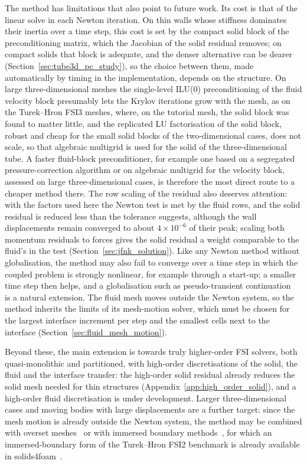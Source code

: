 The method has limitations that also point to future work.
Its cost is that of the linear solve in each Newton iteration.
On thin walls whose stiffness dominates their inertia over a time step, this cost is set by the compact solid block of the preconditioning matrix, which the Jacobian of the solid residual removes; on compact solids that block is adequate, and the denser alternative can be dearer (Section~\ref{sec:tube3d_pc_study}), so the choice between them, made automatically by timing in the implementation, depends on the structure.
On large three-dimensional meshes the single-level ILU(0) preconditioning of the fluid velocity block presumably lets the Krylov iterations grow with the mesh, as on the Turek--Hron FSI3 meshes, where, on the tutorial mesh, the solid block was found to matter little, and the replicated LU factorisation of the solid block, robust and cheap for the small solid blocks of the two-dimensional cases, does not scale, so that algebraic multigrid is used for the solid of the three-dimensional tube.
A faster fluid-block preconditioner, for example one based on a segregated pressure-correction algorithm or on algebraic multigrid for the velocity block, assessed on large three-dimensional cases, is therefore the most direct route to a cheaper method there.
The row scaling of the residual also deserves attention: with the factors used here the Newton test is met by the fluid rows, and the solid residual is reduced less than the tolerance suggests, although the wall displacements remain converged to about $4\times10^{-6}$ of their peak; scaling both momentum residuals to forces gives the solid residual a weight comparable to the fluid's in the test (Section~\ref{sec:jfnk_solution}).
Like any Newton method without globalisation, the method may also fail to converge over a time step in which the coupled problem is strongly nonlinear, for example through a start-up; a smaller time step then helps, and a globalisation such as pseudo-transient continuation~\citep{Knoll2004} is a natural extension.
The fluid mesh moves outside the Newton system, so the method inherits the limits of its mesh-motion solver, which must be chosen for the largest interface increment per step and the smallest cells next to the interface (Section~\ref{sec:fluid_mesh_motion}).

Beyond these, the main extension is towards truly higher-order FSI solvers, both quasi-monolithic and partitioned, with high-order discretisations of the solid, the fluid and the interface transfer: the high-order solid residual already reduces the solid mesh needed for thin structures (Appendix~\ref{app:high_order_solid}), and a high-order fluid discretisation is under development.
Larger three-dimensional cases and moving bodies with large displacements are a further target: since the mesh motion is already outside the Newton system, the method may be combined with overset meshes~\citep{miller2014overset} or with immersed boundary methods~\citep{peskin2002immersed}, for which an immersed-boundary form of the Turek--Hron FSI2 benchmark is already available in solids4foam~\citep{solids4foamImmersedFSI2}.

